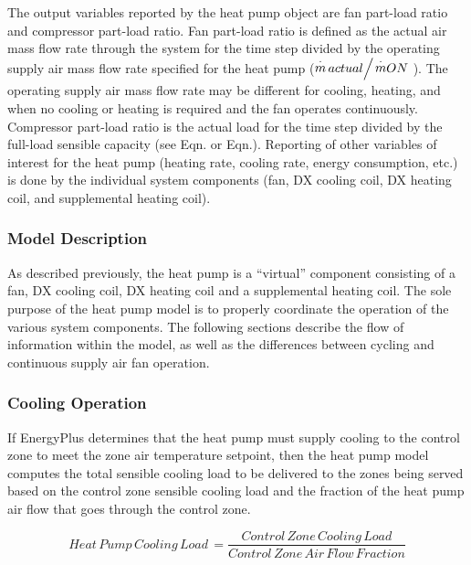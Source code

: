The output variables reported by the heat pump object are fan part-load ratio and compressor part-load ratio. Fan part-load ratio is defined as the actual air mass flow rate through the system for the time step divided by the operating supply air mass flow rate specified for the heat pump (\({{\mathop m\limits^\cdot actual} \mathord{\left/ {\vphantom {{\mathop m\limits^\cdot actual} {\mathop m\limits^\cdot }}} \right. } {\mathop m\limits^\cdot }}ON\) ). The operating supply air mass flow rate may be different for cooling, heating, and when no cooling or heating is required and the fan operates continuously. Compressor part-load ratio is the actual load for the time step divided by the full-load sensible capacity (see Eqn. or Eqn.). Reporting of other variables of interest for the heat pump (heating rate, cooling rate, energy consumption, etc.) is done by the individual system components (fan, DX cooling coil, DX heating coil, and supplemental heating coil).

\subsubsection{Model Description}\label{model-description-3}

As described previously, the heat pump is a ``virtual'' component consisting of a fan, DX cooling coil, DX heating coil and a supplemental heating coil. The sole purpose of the heat pump model is to properly coordinate the operation of the various system components. The following sections describe the flow of information within the model, as well as the differences between cycling and continuous supply air fan operation.

\subsubsection{Cooling Operation}\label{cooling-operation-1}

If EnergyPlus determines that the heat pump must supply cooling to the control zone to meet the zone air temperature setpoint, then the heat pump model computes the total sensible cooling load to be delivered to the zones being served based on the control zone sensible cooling load and the fraction of the heat pump air flow that goes through the control zone.

\begin{equation}
Heat\,Pump\,Cooling\,Load\, = \frac{{Control\,Zone\,Cooling\,Load}}{{Control\,Zone\,Air\,Flow\,Fraction}}
\end{equation}

